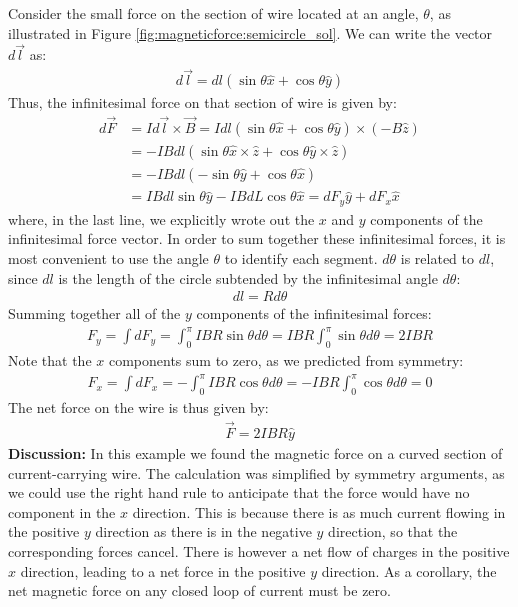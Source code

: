 \begin{example}
Consider the small force on the section of wire located at an angle, $\theta$, as illustrated in Figure \ref{fig:magneticforce:semicircle_sol}. We can write the vector $d\vec l$ as:
\begin{align*}
d\vec l = dl(\sin\theta\hat x + \cos\theta \hat y)
\end{align*}
Thus, the infinitesimal force on that section of wire is given by:
\begin{align*}
d\vec F &= I d\vec l \times \vec B = I dl(\sin\theta\hat x + \cos\theta \hat y)\times (-B\hat z)\\
&=-IBdl (\sin\theta\hat x \times \hat z + \cos\theta \hat y \times \hat z)\\
&=-IBdl (-\sin\theta \hat y + \cos\theta\hat x) \\
&= IBdl\sin\theta \hat y - IBdL\cos\theta \hat x = dF_y\hat y + dF_x \hat x
\end{align*} 
where, in the last line, we explicitly wrote out the $x$ and $y$ components of the infinitesimal force vector. In order to sum together these infinitesimal forces, it is most convenient to use the angle $\theta$ to identify each segment. $d\theta$ is related to $dl$, since $dl$ is the length of the circle subtended by the infinitesimal angle $d\theta$:
\begin{align*}
dl = Rd\theta
\end{align*}
Summing together all of the $y$ components of the infinitesimal forces:
\begin{align*}
F_y = \int dF_y = \int_0^\pi IBR\sin\theta d\theta=IBR \int_0^\pi\sin\theta d\theta=2IBR
\end{align*}
Note that the $x$ components sum to zero, as we predicted from symmetry:
\begin{align*}
F_x = \int dF_x = -\int_0^\pi IBR\cos\theta d\theta=-IBR \int_0^\pi\cos\theta d\theta=0
\end{align*}
The net force on the wire is thus given by:
\begin{align*}
\vec F = 2IBR\hat y
\end{align*}
\textbf{Discussion: }In this example we found the magnetic force on a curved section of current-carrying wire. The calculation was simplified by symmetry arguments, as we could use the right hand rule to anticipate that the force would have no component in the $x$ direction. This is because there is as much current flowing in the positive $y$ direction as there is in the negative $y$ direction, so that the corresponding forces cancel. There is however a net flow of charges in the positive $x$ direction, leading to a net force in the positive $y$ direction. As a corollary, the net magnetic force on any closed loop of current must be zero.
\end{example}
